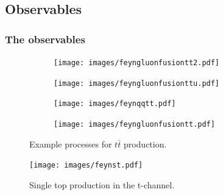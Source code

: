 \documentclass{beamer}
\begin{document}
\subsection{Observables}
\begin{frame}
	\begin{minipage}{0.48\textwidth}
	\end{minipage}
	\hfill
	\begin{minipage}{0.50\textwidth}
		\frametitle{The observables}
		\vspace{-1cm}
		\begin{figure}[h]
			\centering
			\begin{subfigure}{.45\textwidth}
			  \centering
			  \texttt{[image: images/feyngluonfusiontt2.pdf]}
			  \label{fig:ggttt}
			\end{subfigure}
			\begin{subfigure}{.45\textwidth}
			  \centering
			  \texttt{[image: images/feyngluonfusionttu.pdf]}
			  \label{fig:ggttu}
			\end{subfigure}
			\begin{subfigure}{.45\textwidth}
			  \centering
			  \texttt{[image: images/feynqqtt.pdf]}
			  \label{fig:qqtt}
			\end{subfigure}
			\begin{subfigure}{.45\textwidth}
			  \centering
			  \texttt{[image: images/feyngluonfusiontt.pdf]}
			  \label{fig:ggtts}
			\end{subfigure}
			\caption{Example processes for \texorpdfstring{$t\bar{t}$}a  production.}
			\label{fig::ttbar}
		\end{figure}
		\vspace{-1cm}
		\begin{figure}[h]
		\centering
			  \centering
			  \texttt{[image: images/feynst.pdf]}
			  \caption{Single top production in the t-channel.}
			  \label{fig:stt}
		\end{figure}
	\end{minipage}
\end{frame}
\end{document}
